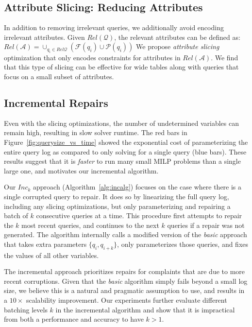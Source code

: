 \subsection{Attribute Slicing: Reducing Attributes}

In addition to removing irrelevant queries, we additionally avoid encoding irrelevant attributes.
Given $Rel\mathcal{(Q)}$, the relevant attributes can be defined as:
$Rel\mathcal{(A)} = \cup_{q_i \in Rel\mathcal{Q}} (\mathcal{F}(q_i)\cup \mathcal{P}(q_i))$
We propose \emph{attribute slicing} optimization that only encodes constraints for attributes in $Rel\mathcal{(A)}$.
We find that this type of slicing can be effective for wide tables along with queries that focus on a small subset of attributes.  



\subsection{Incremental Repairs}\label{sec:incremental}



Even with the slicing optimizations, the number of undetermined variables can remain high, resulting in slow solver runtime.  
The red bars in Figure~\ref{fig:querysize_vs_time} showed the exponential cost of parameterizing the entire query log as compared to only solving for a single query (blue bars).
These results suggest that it is \emph{faster} to run many small MILP problems than a single large one, and motivates our incremental algorithm.

Our \emph{$Inc_k$} approach (Algorithm~\ref{alg:incalg}) focuses on the case where there is a single corrupted query to repair.
It does so by linearizing the full query log, including any slicing optimizations, but only parameterizing and repairing a batch of $k$ consecutive queries at a time. 
This procedure first attempts to repair the $k$ most recent queries, and continues to the next $k$ queries if a repair was not generated.
The algorithm internally calls a modified version of the \emph{basic} approach that takes extra parameters $\{q_i, q_{i+k}\}$, only parameterizes those queries, and fixes the values of all other variables.

The incremental approach prioritizes repairs for complaints that are due to more recent corruptions.
Given that the \emph{basic} algorithm simply fails beyond a small log size, we believe this is a natural and pragmatic assumption to use, and results in 
a $10\times$ scalability improvement.
Our experiments further evaluate different batching levels $k$ in the incremental algorithm and show that it is impractical from both a performance and accuracy to have $k > 1$.

